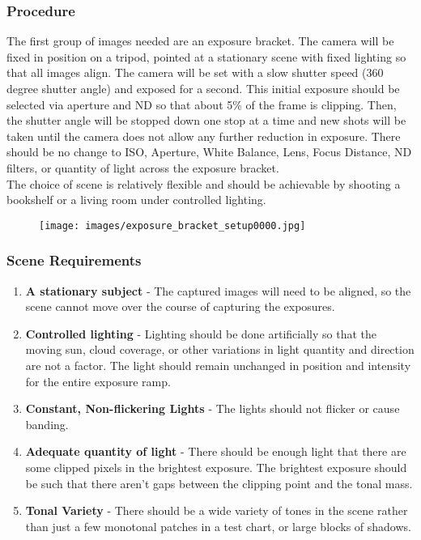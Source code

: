 \documentclass[twoside]{article}
\begin{document}
\subsubsection{Procedure}
The first group of images needed are an exposure bracket. The camera will be fixed in position on a tripod, pointed at a stationary scene with fixed lighting so that all images align. The camera will be set with a slow shutter speed (360 degree shutter angle) and exposed for a second. This initial exposure should be selected via aperture and ND so that about 5\% of the frame is clipping. Then, the shutter angle will be stopped down one stop at a time and new shots will be taken until the camera does not allow any further reduction in exposure. There should be no change to ISO, Aperture, White Balance, Lens, Focus Distance, ND filters, or quantity of light across the exposure bracket. \\

The choice of scene is relatively flexible and should be achievable by shooting a bookshelf or a living room under controlled lighting. \\

\begin{figure}[h]
    \centering
    \texttt{[image: images/exposure\_bracket\_setup0000.jpg]}
\end{figure}


\subsubsection{Scene Requirements}
\begin{enumerate}
    \item \textbf{A stationary subject} - The captured images will need to be aligned, so the scene cannot move over the course of capturing the exposures.
    \item \textbf{Controlled lighting} - Lighting should be done artificially so that the moving sun, cloud coverage, or other variations in light quantity and direction are not a factor. The light should remain unchanged in position and intensity for the entire exposure ramp.
    \item \textbf{Constant, Non-flickering Lights} - The lights should not flicker or cause banding.
    \item \textbf{Adequate quantity of light} - There should be enough light that there are some clipped pixels in the brightest exposure. The brightest exposure should be such that there aren't gaps between the clipping point and the tonal mass.
    \item \textbf{Tonal Variety} - There should be a wide variety of tones in the scene rather than just a few monotonal patches in a test chart, or large blocks of shadows.
\end{enumerate}
\end{document}
